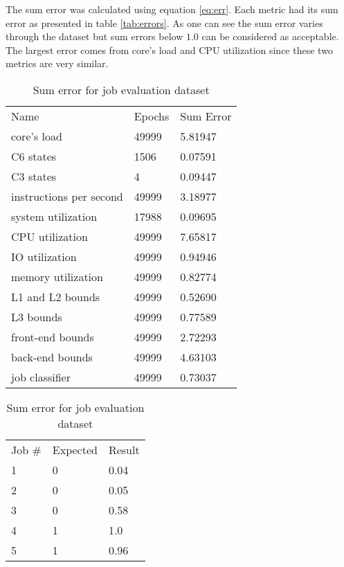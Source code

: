 \documentclass[11pt,a4paper]{article}
\begin{document}
The sum error was calculated using equation \ref{eq:err}. Each metric had its sum error as presented in table \ref{tab:errors}. As one can see the sum error varies through the dataset but sum errors below $1.0$ can be considered as acceptable. The largest error comes from core's load and CPU utilization since these two metrics are very similar.

\begin{table}[ht]
    \parbox{.48\linewidth}{
        \centering
        \begin{tabular}{lll}
        Name                    & Epochs & Sum Error \\
        core's load             & 49999  & 5.81947   \\
        C6 states               & 1506   & 0.07591   \\
        C3 states               & 4      & 0.09447   \\
        instructions per second & 49999  & 3.18977   \\
        system utilization      & 17988  & 0.09695   \\
        CPU utilization         & 49999  & 7.65817   \\
        IO utilization          & 49999  & 0.94946   \\
        memory utilization      & 49999  & 0.82774   \\
        L1 and L2 bounds        & 49999  & 0.52690   \\
        L3 bounds               & 49999  & 0.77589   \\
        front-end bounds        & 49999  & 2.72293   \\
        back-end bounds         & 49999  & 4.63103   \\
        job classifier          & 49999  & 0.73037
        \end{tabular}
        \caption{Overview of sum errors for all networks}
        \label{tab:errors}
    }
    \hfill
    \parbox{.48\linewidth}{
        \centering
        \begin{tabular}{lll}
        Job \# & Expected & Result \\
        1   & 0 & 0.04   \\
        2   & 0 & 0.05   \\
        3   & 0 & 0.58   \\
        4   & 1 & 1.0    \\
        5   & 1 & 0.96
        \end{tabular}
        \caption{Sum error for job evaluation dataset}
        \label{tab:joberr}
    }

\end{table}
\end{document}
